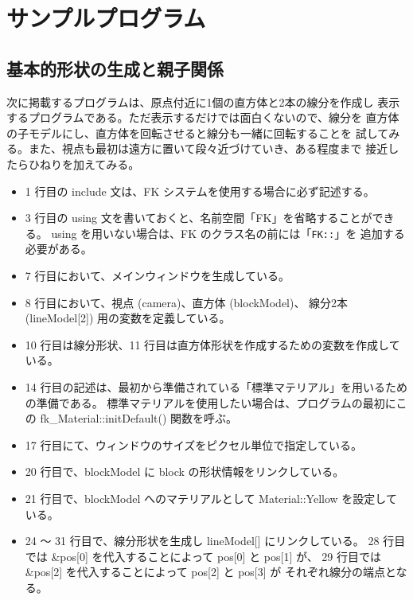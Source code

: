 \chapter{サンプルプログラム} \label{chap:sample}
\section{基本的形状の生成と親子関係}
次に掲載するプログラムは、原点付近に1個の直方体と2本の線分を作成し
表示するプログラムである。ただ表示するだけでは面白くないので、線分を
直方体の子モデルにし、直方体を回転させると線分も一緒に回転することを
試してみる。また、視点も最初は遠方に置いて段々近づけていき、ある程度まで
接近したらひねりを加えてみる。

\begin{itemize}
 \item 1 行目の include 文は、FK システムを使用する場合に必ず記述する。

 \item 3 行目の using 文を書いておくと、名前空間「FK」を省略することができる。
	using を用いない場合は、FK のクラス名の前には「\verb+FK::+」を
	追加する必要がある。

 \item 7 行目において、メインウィンドウを生成している。

 \item 8 行目において、視点 (camera)、直方体 (blockModel)、
	線分2本 (lineModel[2]) 用の変数を定義している。

 \item 10 行目は線分形状、11 行目は直方体形状を作成するための変数を作成している。

 \item 14 行目の記述は、最初から準備されている「標準マテリアル」を用いるための準備である。
	標準マテリアルを使用したい場合は、プログラムの最初にこの
	fk\_Material::initDefault() 関数を呼ぶ。

 \item 17 行目にて、ウィンドウのサイズをピクセル単位で指定している。

 \item 20 行目で、blockModel に block の形状情報をリンクしている。

 \item 21 行目で、blockModel へのマテリアルとして Material::Yellow を設定している。

 \item 24 〜 31 行目で、線分形状を生成し lineModel[] にリンクしている。
	28 行目では \&pos[0] を代入することによって pos[0] と pos[1] が、
	29 行目では \&pos[2] を代入することによって pos[2] と pos[3] が
	それぞれ線分の端点となる。


\end{itemize}
